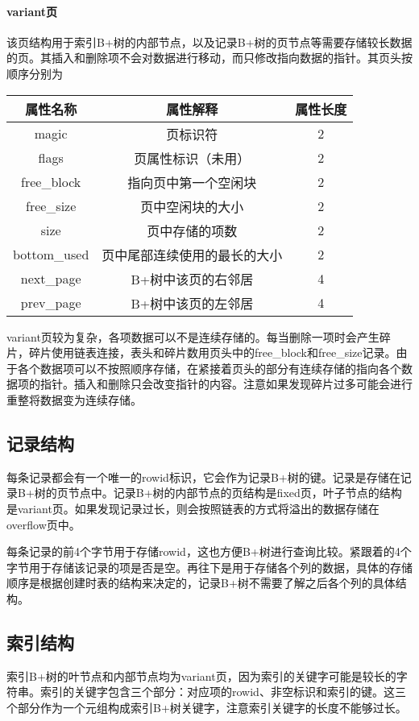 \documentclass[10pt]{article}
\begin{document}
\paragraph{variant页} 该页结构用于索引B+树的内部节点，以及记录B+树的页节点等需要存储较长数据的页。其插入和删除项不会对数据进行移动，而只修改指向数据的指针。其页头按顺序分别为
\begin{table}[H]
	\centering
	\begin{tabular}{|c|c|c|} \hline
		\textbf{属性名称} & \textbf{属性解释} & \textbf{属性长度} \\ \hline
		magic & 页标识符 & 2 \\ \hline
		flags & 页属性标识（未用） & 2 \\ \hline
		free\_block & 指向页中第一个空闲块 & 2 \\ \hline
		free\_size & 页中空闲块的大小 & 2 \\ \hline
		size & 页中存储的项数 & 2 \\ \hline
		bottom\_used & 页中尾部连续使用的最长的大小 & 2 \\ \hline
		next\_page & B+树中该页的右邻居 & 4 \\ \hline
		prev\_page & B+树中该页的左邻居 & 4 \\ \hline
	\end{tabular}
\end{table}

variant页较为复杂，各项数据可以不是连续存储的。每当删除一项时会产生碎片，碎片使用链表连接，表头和碎片数用页头中的free\_block和free\_size记录。由于各个数据项可以不按照顺序存储，在紧接着页头的部分有连续存储的指向各个数据项的指针。插入和删除只会改变指针的内容。注意如果发现碎片过多可能会进行重整将数据变为连续存储。

\subsection{记录结构}
每条记录都会有一个唯一的rowid标识，它会作为记录B+树的键。记录是存储在记录B+树的页节点中。记录B+树的内部节点的页结构是fixed页，叶子节点的结构是variant页。如果发现记录过长，则会按照链表的方式将溢出的数据存储在overflow页中。

每条记录的前4个字节用于存储rowid，这也方便B+树进行查询比较。紧跟着的4个字节用于存储该记录的项是否是空。再往下是用于存储各个列的数据，具体的存储顺序是根据创建时表的结构来决定的，记录B+树不需要了解之后各个列的具体结构。

\subsection{索引结构}
索引B+树的叶节点和内部节点均为variant页，因为索引的关键字可能是较长的字符串。索引的关键字包含三个部分：对应项的rowid、非空标识和索引的键。这三个部分作为一个元组构成索引B+树关键字，注意索引关键字的长度不能够过长。
\end{document}
